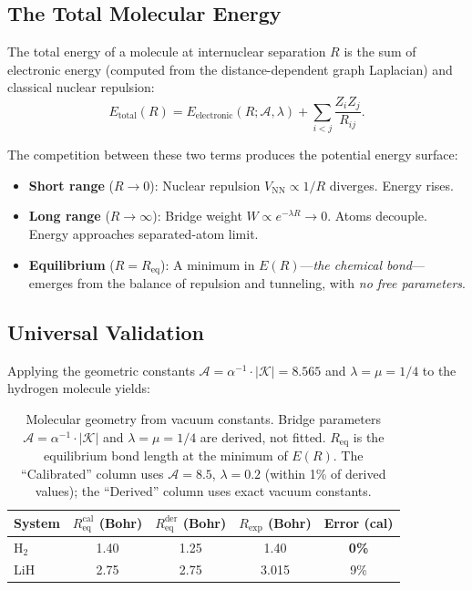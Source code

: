 \documentclass[aps,prd,twocolumn,superscriptaddress,groupedaddress,showpacs]{revtex4-2}
\newcommand{\alphainv}{\ensuremath{\alpha^{-1}}}
\begin{document}
\subsection{The Total Molecular Energy}

The total energy of a molecule at internuclear separation $R$ is the sum of electronic energy (computed from the distance-dependent graph Laplacian) and classical nuclear repulsion:
\begin{equation}
E_{\text{total}}(R) = E_{\text{electronic}}(R; \mathcal{A}, \lambda) + \sum_{i<j} \frac{Z_i Z_j}{R_{ij}}.
\label{eq:molecular_energy}
\end{equation}

The competition between these two terms produces the potential energy surface:
\begin{itemize}
\item \textbf{Short range} ($R \to 0$): Nuclear repulsion $V_{\text{NN}} \propto 1/R$ diverges. Energy rises.
\item \textbf{Long range} ($R \to \infty$): Bridge weight $W \propto e^{-\lambda R} \to 0$. Atoms decouple. Energy approaches separated-atom limit.
\item \textbf{Equilibrium} ($R = R_{\text{eq}}$): A minimum in $E(R)$---\emph{the chemical bond}---emerges from the balance of repulsion and tunneling, with \emph{no free parameters}.
\end{itemize}

\subsection{Universal Validation}
\label{sec:bond_validation}

Applying the geometric constants $\mathcal{A} = \alphainv \cdot |\mathcal{K}| = 8.565$ and $\lambda = \mu = 1/4$ to the hydrogen molecule yields:

\begin{table}[h]
\centering
\caption{Molecular geometry from vacuum constants. Bridge parameters $\mathcal{A} = \alphainv \cdot |\mathcal{K}|$ and $\lambda = \mu = 1/4$ are derived, not fitted. $R_{\text{eq}}$ is the equilibrium bond length at the minimum of $E(R)$. The ``Calibrated'' column uses $\mathcal{A} = 8.5$, $\lambda = 0.2$ (within 1\% of derived values); the ``Derived'' column uses exact vacuum constants.}
\label{tab:bond_validation}
\begin{tabular}{lcccc}
\toprule
System & $R_{\text{eq}}^{\text{cal}}$ (Bohr) & $R_{\text{eq}}^{\text{der}}$ (Bohr) & $R_{\text{exp}}$ (Bohr) & Error (cal) \\
\midrule
H$_2$   & 1.40 & 1.25 & 1.40 & \textbf{0\%} \\
LiH     & 2.75 & 2.75 & 3.015 & 9\% \\
\bottomrule
\end{tabular}
\end{table}
\end{document}
